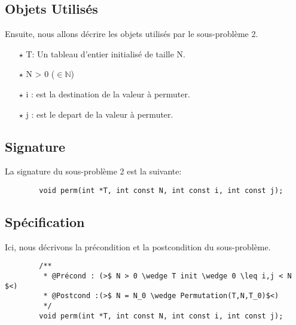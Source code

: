 \documentclass[a4paper, 11pt, oneside]{article}
\begin{document}
    \subsection{Objets Utilisés}
        Ensuite, nous allons décrire les objets utilisés par le sous-problème 2.
        \begin{itemize}
            \item[$\star$] T: Un tableau d'entier initialisé de taille N.
            \item[$\star$] N > 0 ($\in \mathbb{N}$)
            \item[$\star$] i : est la destination de la valeur à permuter.
            \item[$\star$] j : est le depart de la valeur à permuter.
        \end{itemize}

    \subsection{Signature}
        La signature du sous-problème 2 est la suivante:
        \begin{lstlisting}
        void perm(int *T, int const N, int const i, int const j);
        \end{lstlisting}
    
    \subsection{Spécification}
        Ici, nous décrivons la précondition et la postcondition du sous-problème.
        \begin{lstlisting}
        /**
         * @Précond : (>$ N > 0 \wedge T init \wedge 0 \leq i,j < N $<)
         * @Postcond :(>$ N = N_0 \wedge Permutation(T,N,T_0)$<)
         */
        void perm(int *T, int const N, int const i, int const j);
        \end{lstlisting}
    
\end{document}
